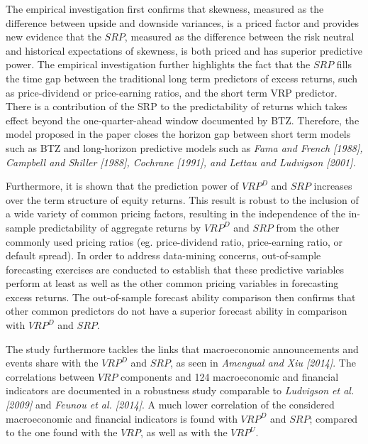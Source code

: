 \vspace{4mm}
The empirical investigation first confirms that skewness, measured as the difference between upside and downside variances, is a priced factor and provides new evidence that the $SRP$, measured as the difference between the risk neutral and historical expectations of skewness, is both priced and has superior predictive power. 
The empirical investigation further highlights the fact that the $SRP$ fills the time gap between the traditional long term predictors of excess returns, such as price-dividend or price-earning ratios, and the short term VRP predictor. There is a contribution of the SRP to the predictability of returns which takes effect beyond the one-quarter-ahead window documented by BTZ. Therefore, the model proposed in the paper closes the horizon gap between short term models such as BTZ and long-horizon predictive models such as \textit{Fama and French [1988], Campbell and Shiller [1988], Cochrane [1991], and Lettau and Ludvigson [2001].}

\vspace{4mm}
Furthermore, it is shown that the prediction power of $VRP^D$ and $SRP$ increases over the term structure of equity returns. This result is robust to the inclusion of a wide variety of common pricing factors, resulting in the independence of the in-sample predictability of aggregate returns by $VRP^D$  and $SRP$ from the other commonly used pricing ratios (eg. price-dividend ratio, price-earning ratio, or default spread). In order to address data-mining concerns, out-of-sample forecasting exercises are conducted to establish that these predictive variables perform at least as well as the other common pricing variables in forecasting excess returns. The out-of-sample forecast ability comparison then confirms that other common predictors do not have a superior forecast ability in comparison with $VRP^D$ and $SRP$.

\vspace{4mm}
The study furthermore tackles the links that macroeconomic announcements and events share with the $VRP^D$ and $SRP$, as seen in \textit{Amengual and Xiu [2014]}. The correlations between $VRP$ components and 124 macroeconomic and financial indicators are documented in a robustness study comparable to \textit{Ludvigson et al. [2009]} and \textit{Feunou et al. [2014]}. A much lower correlation of the considered macroeconomic and financial indicators is found with $VRP^D$ and $SRP$; compared to the one found with the $VRP$, as well as with the $VRP^U$.

